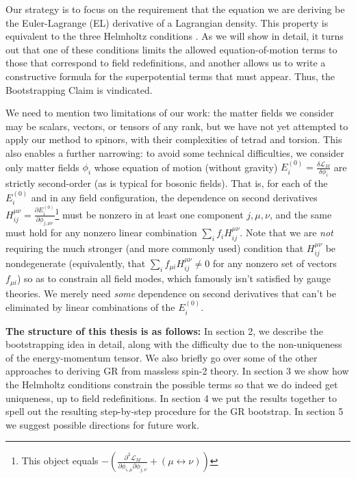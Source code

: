 \documentclass[aps,physrev,preprint,groupedaddress]{revtex4-2}
\begin{document}
Our strategy is to focus on the requirement that the equation we are deriving be the Euler-Lagrange (EL) derivative of a Lagrangian density. This property is equivalent to the three Helmholtz conditions \cite{Helmholtz}. As we will show in detail, it turns out that one of these conditions limits the allowed equation-of-motion terms to those that correspond to field redefinitions, and another allows us to write a constructive formula for the superpotential terms that must appear. Thus, the Bootstrapping Claim is vindicated.

 We need to mention two limitations of our work: the matter fields we consider may be scalars, vectors, or tensors of any rank, but we have not yet attempted to apply our method to spinors, with their complexities of tetrad and torsion. This also enables a further narrowing: to avoid some technical difficulties, we consider only matter fields \(\phi_i\) whose equation of motion (without gravity) \(E_i^{(0)}=\frac{\delta \mathcal{L}_M}{\delta \phi_i}\) are strictly second-order (as is typical for bosonic fields). That is, for each of the \(E_i^{(0)}\) and in any field configuration, the dependence on second derivatives \(H_{ij}^{\mu\nu}=\frac{\partial E_i^{(0)}}{\partial \phi_{j,\mu\nu}}\)\footnote{This object equals \(-\left(\frac{\partial^2\mathcal{L}_M}{\partial \phi_{i,\mu}\partial\phi_{j,\nu}}+(\mu\leftrightarrow\nu)\right)\)} must be nonzero in at least one component \(j,\mu,\nu\), and the same must hold for any nonzero linear combination \(\sum_i f_iH_{ij}^{\mu\nu}\). Note that we are \textit{not} requiring the much stronger (and more commonly used) condition that \(H_{ij}^{\mu\nu}\) be nondegenerate (equivalently, that \(\sum_{i} f_{\mu i}H_{ij}^{\mu\nu}\ne0\) for any nonzero set of vectors \(f_{\mu i}\)) so as to constrain all field modes, which famously isn't satisfied by gauge theories. We merely need \textit{some} dependence on second derivatives that can't be eliminated by linear combinations of the \(E_i^{(0)}\).

\textbf{The structure of this thesis is as follows:} In section 2, we describe the bootstrapping idea in detail, along with the difficulty due to the non-uniqueness of the energy-momentum tensor. We also briefly go over some of the other approaches to deriving GR from massless spin-2 theory. In section 3 we show how the Helmholtz conditions constrain the possible terms so that we do indeed get uniqueness, up to field redefinitions. In section 4  we put the results together to spell out the resulting step-by-step procedure for the GR bootstrap. In section 5 we suggest possible directions for future work.
\end{document}
